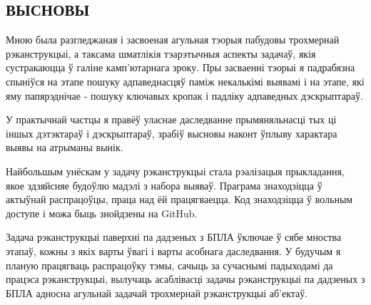 \begin{center}
    \section*{ВЫСНОВЫ}
\end{center}

Мною была разгледжаная і засвоеная агульная тэорыя пабудовы трохмернай рэканструкцыі, а таксама шматлікія
тэарэтычныя аспекты задачаў, якія сустракаюцца ў галіне камп'ютарнага зроку.
Пры засваенні тэорыі я падрабязна спыніўся на этапе пошуку адпаведнасцяў паміж некалькімі выявамі і на этапе,
які яму папярэднічае - пошуку ключавых кропак і падліку адпаведных дэскрыптараў.

У практычнай частцы я правёў уласнае даследванне прымяняльнасці тых ці іншых дэтэктараў і дэскрыптараў,
зрабіў высновы наконт ўплыву характара выявы на атрыманы вынік.

Найбольшым унёскам у задачу рэканструкцыі стала рэалізацыя прыкладання, якое здзяйсняе будоўлю мадэлі з набора выяваў.
Праграма знаходзіцца ў актыўнай распрацоўцы, праца над ёй працягваецца. Код знаходзіцца ў вольным доступе
і можа быць знойдзены на GitHub.

Задача рэканструкцыі паверхні па дадзеных з БПЛА ўключае ў сябе мноства этапаў, кожны з якіх варты ўвагі і варты
асобнага даследвання. У будучым я планую працягваць распрацоўку тэмы, сачыць за сучаснымі падыходамі да працэса
рэканструкцыі, вылучаць асаблівасці задачы рэканструкцыі па дадзеных з БПЛА адносна агульнай задачай трохмернай
рэканструкцыі аб'ектаў.

\newpage
